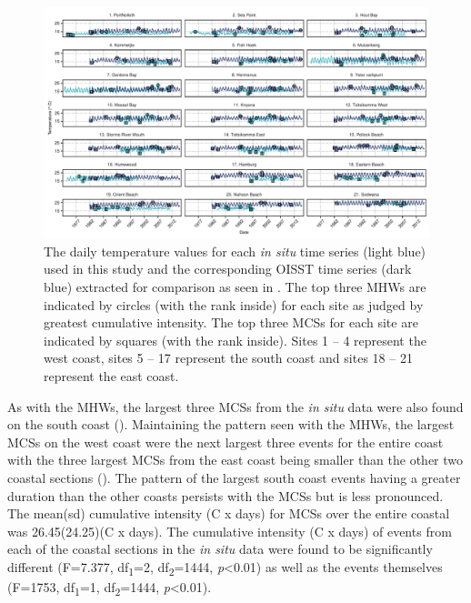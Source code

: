 \documentclass[a4paper,10pt,review]{elsarticle}
\begin{document}
\begin{figure}
\centering 
\includegraphics[width=1.0\textwidth]{figure2.pdf}
\caption{The daily temperature values for each \emph{in situ} time series (light blue) used in this study and the corresponding OISST time series (dark blue) extracted for comparison as seen in . The top three MHWs are indicated by circles (with the rank inside) for each site as judged by greatest cumulative intensity. The top three MCSs for each site are indicated by squares (with the rank inside). Sites 1 -- 4 represent the west coast, sites 5 -- 17 represent the south coast and sites 18 -- 21 represent the east coast.}
\label{fig:Figure2}
\end{figure}

As with the MHWs, the largest three MCSs from the \emph{in situ} data were also found on the south coast (). Maintaining the pattern seen with the MHWs, the largest MCSs on the west coast were the next largest three events for the entire coast with the three largest MCSs from the east coast being smaller than the other two coastal sections (). The pattern of the largest south coast events having a greater duration than the other coasts persists with the MCSs but is less pronounced. The mean(sd) cumulative intensity (\degree C x days) for MCSs over the entire coastal was 26.45(24.25)(\degree C x days). The cumulative intensity (\degree C x days) of events from each of the coastal sections in the \emph{in situ} data were found to be significantly different (F=7.377, df\textsubscript{1}=2, df\textsubscript{2}=1444, \emph{p}<0.01) as well as the events themselves (F=1753, df\textsubscript{1}=1, df\textsubscript{2}=1444, \emph{p}<0.01).
\end{document}
